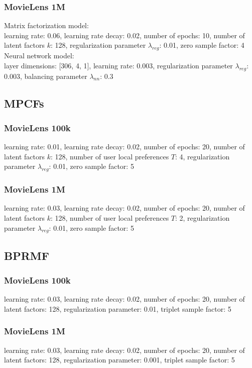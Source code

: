 \subsubsection{MovieLens 1M}
Matrix factorization model:\\
learning rate: 0.06, learning rate decay: 0.02, number of epochs: 10, number of latent factors $k$: 128, regularization parameter $\lambda_{reg}$: 0.01, zero sample factor: 4
Neural network model:\\
layer dimensions: [306, 4, 1], learning rate: 0.003, regularization parameter $\lambda_{reg}$: 0.003, balancing parameter $\lambda_{nn}$: 0.3

\subsection{MPCFs}
\subsubsection{MovieLens 100k}
learning rate: 0.01, learning rate decay: 0.02, number of epochs: 20, number of latent factors $k$: 128, number of user local preferences $T$: 4, regularization parameter $\lambda_{reg}$: 0.01, zero sample factor: 5

\subsubsection{MovieLens 1M}
learning rate: 0.03, learning rate decay: 0.02, number of epochs: 20, number of latent factors $k$: 128, number of user local preferences $T$: 2, regularization parameter $\lambda_{reg}$: 0.01, zero sample factor: 5


\subsection{BPRMF}
\subsubsection{MovieLens 100k}
learning rate: 0.03, learning rate decay: 0.02, number of epochs: 20, number of latent factors: 128, regularization parameter: 0.01, triplet sample factor: 5

\subsubsection{MovieLens 1M}
learning rate: 0.03, learning rate decay: 0.02, number of epochs: 20, number of latent factors: 128, regularization parameter: 0.001, triplet sample factor: 5

